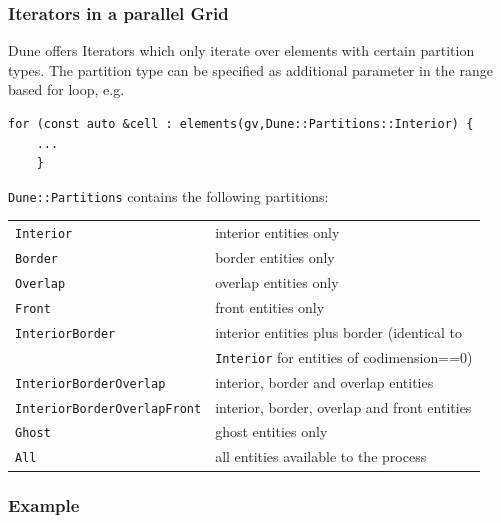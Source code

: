 \documentclass[aspectratio=169,11pt]{beamer}
\theoremstyle{definition}
\begin{document}
\begin{frame}[fragile]
  \frametitle<presentation>{Iterators in a parallel Grid}
  \small
  Dune offers Iterators which only iterate over elements with certain partition types. The partition type can be specified as additional parameter in the range based for loop, e.g.
\begin{lstlisting}[breaklines=true,basicstyle=\ttfamily\small]
    for (const auto &cell : elements(gv,Dune::Partitions::Interior) {
    ...
    }
\end{lstlisting}

\lstinline!Dune::Partitions! contains the following partitions:\smallskip\\

    \begin{tabular}{ll}
      \lstinline!Interior! & interior entities only\\
      \lstinline!Border! & border entities only\\
      \lstinline!Overlap! & overlap entities only\\
      \lstinline!Front! & front entities only\\
      \lstinline!InteriorBorder! & interior entities plus border (identical to \\
     & \lstinline!Interior! for entities of  codimension==0)\\
      \lstinline!InteriorBorderOverlap! & interior, border and overlap entities\\
      \lstinline!InteriorBorderOverlapFront! & interior, border, overlap and front entities \\
      \lstinline!Ghost! & ghost entities only\\
      \lstinline!All! & all entities available to the process
    \end{tabular}
\end{frame}

\begin{frame}
  \frametitle{Example}
  
\end{frame}
\end{document}
